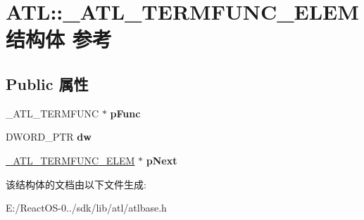 \hypertarget{struct_a_t_l_1_1___a_t_l___t_e_r_m_f_u_n_c___e_l_e_m}{}\section{A\+TL\+:\+:\+\_\+\+A\+T\+L\+\_\+\+T\+E\+R\+M\+F\+U\+N\+C\+\_\+\+E\+L\+E\+M结构体 参考}
\label{struct_a_t_l_1_1___a_t_l___t_e_r_m_f_u_n_c___e_l_e_m}
\subsection*{Public 属性}
\begin{DoxyCompactItemize}
\item 
\mbox{\label{struct_a_t_l_1_1___a_t_l___t_e_r_m_f_u_n_c___e_l_e_m_a14cbff637eed5e9504e4170f3383befd}} 
\+\_\+\+A\+T\+L\+\_\+\+T\+E\+R\+M\+F\+U\+NC $\ast$ {\bfseries p\+Func}
\item 
\mbox{\label{struct_a_t_l_1_1___a_t_l___t_e_r_m_f_u_n_c___e_l_e_m_a4b8e8683c64c600e7c952f780ead7d30}} 
D\+W\+O\+R\+D\+\_\+\+P\+TR {\bfseries dw}
\item 
\mbox{\label{struct_a_t_l_1_1___a_t_l___t_e_r_m_f_u_n_c___e_l_e_m_ad63b3af42e4f2a9264a93bb285c33a9e}} 
\hyperlink{struct_a_t_l_1_1___a_t_l___t_e_r_m_f_u_n_c___e_l_e_m}{\+\_\+\+A\+T\+L\+\_\+\+T\+E\+R\+M\+F\+U\+N\+C\+\_\+\+E\+L\+EM} $\ast$ {\bfseries p\+Next}
\end{DoxyCompactItemize}


该结构体的文档由以下文件生成\+:\begin{DoxyCompactItemize}
\item 
E\+:/\+React\+O\+S-\/0../sdk/lib/atl/atlbase.\+h\end{DoxyCompactItemize}
